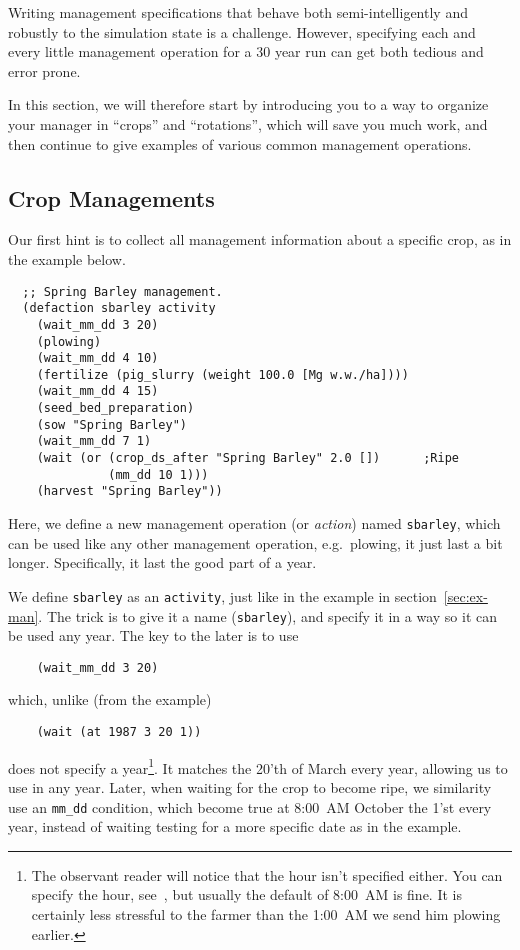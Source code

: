 \documentclass[a4paper,11pt]{article}
\begin{document}
Writing management specifications that behave both semi-intelligently
and robustly to the simulation state is a challenge.  However,
specifying each and every little management operation for a 30 year
run can get both tedious and error prone.

In this section, we will therefore start by introducing you to a way
to organize your manager in ``crops'' and ``rotations'', which will
save you much work, and then continue to give examples of various
common management operations.

\subsection{Crop Managements}
\label{sec:crop-man}

Our first hint is to collect all management information about a
specific crop, as in the example below.
\begin{verbatim}
  ;; Spring Barley management.
  (defaction sbarley activity
    (wait_mm_dd 3 20)
    (plowing)
    (wait_mm_dd 4 10)
    (fertilize (pig_slurry (weight 100.0 [Mg w.w./ha])))
    (wait_mm_dd 4 15)
    (seed_bed_preparation)
    (sow "Spring Barley")
    (wait_mm_dd 7 1)
    (wait (or (crop_ds_after "Spring Barley" 2.0 [])      ;Ripe
              (mm_dd 10 1)))
    (harvest "Spring Barley"))
\end{verbatim}
Here, we define a new management operation (or \emph{action}) named
\texttt{sbarley}, which can be used like any other management
operation, e.g.\ plowing, it just last a bit longer.  Specifically, it
last the good part of a year.

We define \texttt{sbarley} as an \texttt{activity}, just like in the
example in section~\ref{sec:ex-man}.  The trick is to give it a name
(\texttt{sbarley}), and specify it in a way so it can be used any
year.  The key to the later is to use
\begin{verbatim}
    (wait_mm_dd 3 20)
\end{verbatim}
which, unlike (from the example)
\begin{verbatim}
    (wait (at 1987 3 20 1))
\end{verbatim}
does not specify a year\footnote{The observant reader will notice that
  the hour isn't specified either.  You can specify the hour,
  see~\cite{dina81}, but usually the default of 8:00~AM is fine.  It
  is certainly less stressful to the farmer than the 1:00~AM we send
  him plowing earlier.}.  It matches the 20'th of March every year,
allowing us to use in any year.  Later, when waiting for the crop to
become ripe, we similarity use an \texttt{mm\_dd} condition, which
become true at 8:00~AM October the 1'st every year, instead of waiting
testing for a more specific date as in the example.
\end{document}
